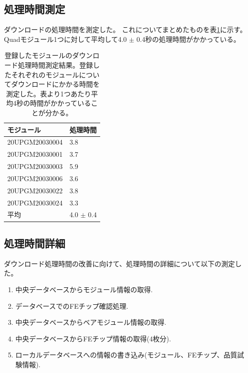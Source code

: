 \subsection{処理時間測定}
ダウンロードの処理時間を測定した。
これについてまとめたものを表\ref{download_measurement}に示す。
Quadモジュール1つに対して平均して4.0 $\pm$ 0.4秒の処理時間がかかっている。

\begin{table}[tbp]
\begin{center}
\caption[登録したモジュールのダウンロード処理時間測定結果]{登録したモジュールのダウンロード処理時間測定結果。登録したそれぞれのモジュールについてダウンロードにかかる時間を測定した。表より1つあたり平均4秒の時間がかかっていることが分かる。}
\label{download_measurement}
  \begin{tabular}{|ll|} \hline
    モジュール & 処理時間 \\ \hline
    20UPGM20030004 &  3.8 \\ 
    20UPGM20030001 &  3.7 \\ 
    20UPGM20030003 &  5.9 \\ 
    20UPGM20030006 &  3.6 \\ 
    20UPGM20030022 &  3.8 \\ 
    20UPGM20030024 &  3.3 \\ \hline 
    平均           &  4.0 $\pm$ 0.4 \\\hline
  \end{tabular}
\end{center}
\end{table}

\subsection{処理時間詳細}
ダウンロード処理時間の改善に向けて、処理時間の詳細について以下の測定した。
\begin{enumerate}
  \item 中央データベースからモジュール情報の取得.
  \item データベースでのFEチップ確認処理.
  \item 中央データベースからベアモジュール情報の取得.
  \item 中央データベースからFEチップ情報の取得(4枚分).
  \item ローカルデータベースへの情報の書き込み(モジュール、FEチップ、品質試験情報).
\end{enumerate}

